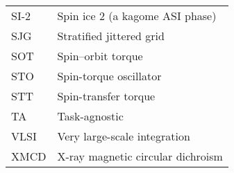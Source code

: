 {\begin{longtable}[l]{ll}
        SI-2  & Spin ice 2 (a kagome ASI phase)             \\
        SJG   & Stratified jittered grid                    \\
        SOT   & Spin--orbit torque                           \\
        STO   & Spin-torque oscillator                      \\
        STT   & Spin-transfer torque                        \\
        TA    & Task-agnostic                               \\
        VLSI  & Very large-scale integration                \\
        XMCD  & X-ray magnetic circular dichroism           \\
    \end{longtable}
}
